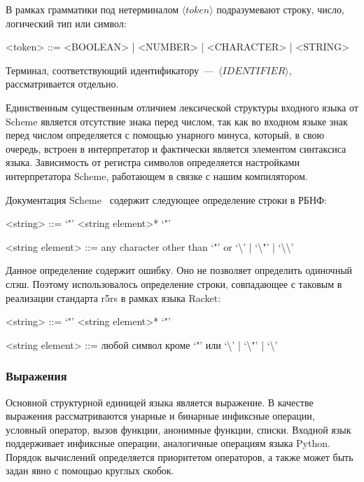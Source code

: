 \documentclass[12pt,a4paper,oneside]{extarticle}
\begin{document}
            В рамках грамматики под нетерминалом $\langle token\rangle$ подразумевают строку, число, логический тип или символ:
            \begin{grammar}
                <token> ::= <BOOLEAN> | <NUMBER> | <CHARACTER> | <STRING>
            \end{grammar}
            Терминал, соответствующий идентификатору~---~$\langle IDENTIFIER \rangle$, рассматривается отдельно.

            Единственным существенным отличием лексической структуры входного языка от Scheme является отсутствие знака перед числом, так как во входном языке знак перед числом определяется с помощью унарного минуса, который, в свою очередь, встроен в интерпретатор и фактически является элементом синтаксиса языка.
            Зависимость от регистра символов определяется настройками интерпретатора Scheme, работающем в связке с нашим компилятором.            

            Документация Sсheme~\cite{r5rs} содержит следующее определение строки в РБНФ:
            \begin{grammar}
                <string> ::= `"' <string element>* `"'

                <string element> ::= any character other than `"' or `\textbackslash' | `\textbackslash "' | `\textbackslash \textbackslash'
            \end{grammar}
            Данное определение содержит ошибку.
            Оно не позволяет определить одиночный слэш.
            Поэтому использовалось определение строки, совпадающее с таковым в реализации стандарта r5rs в рамках языка Racket: 
            \begin{grammar}
                <string> ::= `"' <string element>* `"'

                <string element> ::= любой символ кроме `"' или `\textbackslash' | `\textbackslash "' | `\textbackslash'
            \end{grammar}

        \subsubsection{Выражения}
            Основной структурной единицей языка является выражение.
            В качестве выражения рассматриваются унарные и бинарные инфиксные операции, условный оператор, вызов функции, анонимные функции, списки.
            Входной язык поддерживает инфиксные операции, аналогичные операциям языка Python.
            Порядок вычислений определяется приоритетом операторов, а также может быть задан явно с помощью круглых скобок.
\end{document}
